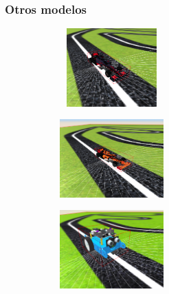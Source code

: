 \documentclass[xcolor={table}]{beamer}
\begin{document}
		\begin{frame}
			\frametitle{Otros modelos}
		\begin{figure}[H]
        \centering
        \begin{subfigure}{\textwidth}
         \includegraphics[width=4cm, height=3cm]{img/f1_williams.png}
 \label{fig:f1williams}
        \end{subfigure}
        \begin{subfigure}{\textwidth}
         \includegraphics[width=4cm, height=3cm]{img/f1_renault.png}
   \label{fig:f1renault}
        \end{subfigure}
        \begin{subfigure}{\textwidth}
         \includegraphics[width=4cm, height=3cm]{img/mBot_model.png}
   \label{fig:mbot}
        \end{subfigure}
        \end{figure}
		\end{frame}
		
\end{document}
